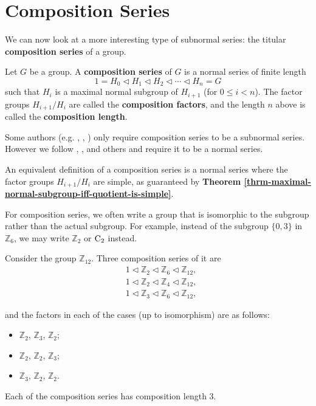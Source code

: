 \section{Composition Series}
We can now look at a more interesting type of subnormal series: the titular \textbf{composition series} of a group.
\begin{definition}
    Let $G$ be a group. A \textbf{composition series} of $G$ is a normal series of finite length
    \[
        1 = H_0 \lhd H_1 \lhd H_2 \lhd \cdots \lhd H_n = G  
    \]
    such that $H_i$ is a maximal normal subgroup of $H_{i+1}$ (for $0 \leq i < n$). The factor groups $H_{i+1}/H_i$ are called the \textbf{composition factors}, and the length $n$ above is called the \textbf{composition length}.
\end{definition}
\begin{remark}
    Some authors (e.g. \cite{hungerford_1980}, \cite{humphreys_1996}, \cite{milne_2021}) only require composition series to be a subnormal series. However we follow \cite{cohn_1982}, \cite{clark_1984}, \cite{proofwiki_compositionseriesdefinition} and others and require it to be a normal series.
\end{remark}
\begin{remark}
    An equivalent definition of a composition series is a normal series where the factor groups $H_{i+1}/H_i$ are simple, as guaranteed by \textbf{Theorem \ref{thrm-maximal-normal-subgroup-iff-quotient-is-simple}}.
\end{remark}
\begin{remark}
    For composition series, we often write a group that is isomorphic to the subgroup rather than the actual subgroup. For example, instead of the subgroup $\{0, 3\}$ in $\mathbb{Z}_6$, we may write $\mathbb{Z}_2$ or $\mathrm{C}_{2}$ instead.
\end{remark}

\begin{example}
    Consider the group $\mathbb{Z}_{12}$. Three composition series of it are
    \begin{align*}
        &1 \lhd \mathbb{Z}_2 \lhd \mathbb{Z}_6 \lhd \mathbb{Z}_{12},\\
        &1 \lhd \mathbb{Z}_2 \lhd \mathbb{Z}_4 \lhd \mathbb{Z}_{12},\\
        &1 \lhd \mathbb{Z}_3 \lhd \mathbb{Z}_6 \lhd \mathbb{Z}_{12},
    \end{align*}
    
    and the factors in each of the cases (up to isomorphism) are as follows:
    \begin{itemize}
        \item $\mathbb{Z}_2$, $\mathbb{Z}_3$, $\mathbb{Z}_2$;
        \item $\mathbb{Z}_2$, $\mathbb{Z}_2$, $\mathbb{Z}_3$;
        \item $\mathbb{Z}_3$, $\mathbb{Z}_2$, $\mathbb{Z}_2$.
    \end{itemize}
    Each of the composition series has composition length 3.
\end{example}

